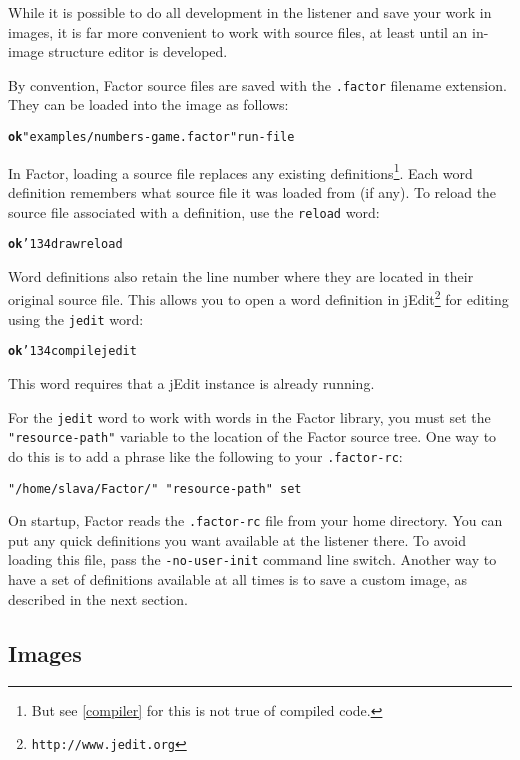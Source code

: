 \documentclass{report}
\newcommand{\bs}{\char'134}
\begin{document}
While it is possible to do all development in the listener and save your work in images, it is far more convenient to work with source files, at least until an in-image structure editor is developed.

By convention, Factor source files are saved with the \texttt{.factor} filename extension. They can be loaded into the image as follows:

\begin{alltt}
\textbf{ok} "examples/numbers-game.factor" run-file
\end{alltt}

In Factor, loading a source file replaces any existing definitions\footnote{But see \ref{compiler} for this is not true of compiled code.}. Each word definition remembers what source file it was loaded from (if any). To reload the source file associated with a definition, use the \texttt{reload} word:

\begin{alltt}
\textbf{ok} \bs draw reload
\end{alltt}

Word definitions also retain the line number where they are located in their original source file. This allows you to open a word definition in jEdit\footnote{\texttt{http://www.jedit.org}} for editing using the
\texttt{jedit} word:

\begin{alltt}
\textbf{ok} \bs compile jedit
\end{alltt}

This word requires that a jEdit instance is already running.

For the \texttt{jedit} word to work with words in the Factor library, you must set the \texttt{"resource-path"} variable to the location of the Factor source tree. One way to do this is to add a phrase like the following to your \texttt{.factor-rc}:

\begin{verbatim}
"/home/slava/Factor/" "resource-path" set
\end{verbatim}

On startup, Factor reads the \texttt{.factor-rc} file from your home directory. You can put
any quick definitions you want available at the listener there. To avoid loading this
file, pass the \texttt{-no-user-init} command line switch. Another way to have a set of definitions available at all times is to save a custom image, as described in the next section.

\subsection{Images}
\end{document}
